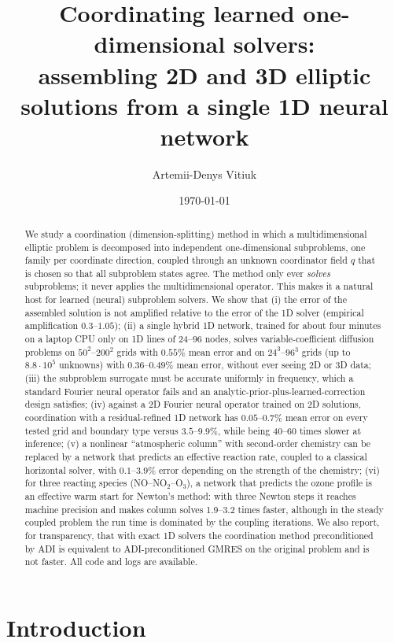 \documentclass[11pt]{article}
\title{Coordinating learned one-dimensional solvers:\\
assembling 2D and 3D elliptic solutions from a single 1D neural network}
\author{Artemii-Denys Vitiuk}
\date{\today}
\begin{document}
\maketitle

\begin{abstract}
We study a coordination (dimension-splitting) method in which a multidimensional
elliptic problem is decomposed into independent one-dimensional subproblems, one family
per coordinate direction, coupled through an unknown coordinator field $q$ that is chosen
so that all subproblem states agree. The method only ever \emph{solves} subproblems; it
never applies the multidimensional operator. This makes it a natural host for learned
(neural) subproblem solvers. We show that (i) the error of the assembled solution is not
amplified relative to the error of the 1D solver (empirical amplification $0.3$--$1.05$);
(ii) a single hybrid 1D network, trained for about four minutes on a laptop CPU only on 1D
lines of 24--96 nodes, solves variable-coefficient diffusion problems on $50^2$--$200^2$
grids with $0.55\%$ mean error and on $24^3$--$96^3$ grids (up to $8.8\cdot10^5$ unknowns) with
$0.36$--$0.49\%$ mean error, without ever seeing 2D or 3D data; (iii) the subproblem surrogate
must be accurate uniformly in frequency, which a standard Fourier neural operator fails and
an analytic-prior-plus-learned-correction design satisfies; (iv) against a 2D Fourier neural operator
trained on 2D solutions, coordination with a residual-refined 1D network has $0.05$--$0.7\%$ mean error on every tested grid and
boundary type versus $3.5$--$9.9\%$, while being 40--60 times slower at inference; (v) a nonlinear ``atmospheric
column'' with second-order chemistry can be replaced by a network that predicts an effective
reaction rate, coupled to a classical horizontal solver, with $0.1$--$3.9\%$ error depending on
the strength of the chemistry; (vi) for three reacting species (NO--NO$_2$--O$_3$), a network that predicts the
ozone profile is an effective warm start for Newton's method: with three Newton steps it reaches machine
precision and makes column solves 1.9--3.2 times faster, although in the steady coupled problem the run time
is dominated by the coupling iterations. We also report, for transparency, that with exact 1D solvers
the coordination method preconditioned by ADI is equivalent to ADI-preconditioned GMRES on
the original problem and is not faster. All code and logs are available.
\end{abstract}

\section{Introduction}
\end{document}
